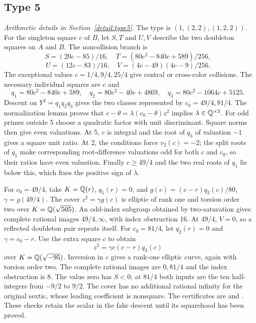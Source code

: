 \subsection{Type 5}\label{app:type5}
\noindent\emph{Arithmetic details in Section~\ref{detail:type5}.}\enspace
The type is $(1,(2,2),(1,2,2))$. For the singleton square $c$ of $B$,
let $S,T$ and $U,V$ describe the two doubleton squares on $A$ and $B$.
The noncollision branch is
\[
 S=(20c-85)/16,\quad T=(80c^2-840c+589)/256,
\]\[
 U=(12c-83)/16,\quad V=(4c-49)(4c-9)/256.
\]
The exceptional values $c=1/4,9/4,25/4$ give central or cross-color
collisions. The necessary individual squares are $c$ and
\[
 q_1=80c^2-840c+589,\quad q_2=80c^2-40c+4869,
 \quad q_3=80c^2-1064c+5125.
\]
Descent on $Y^2=q_1q_2q_3$ gives the two classes represented by
$c_0=49/4,81/4$. The normalization lemma proves that
$c-\theta=\lambda(c_0-\theta)z^2$ implies
$\lambda\in\mathbb Q^{\times2}$. For odd primes outside 5 choose a
quadratic factor with unit discriminant. Square norms then give even
valuations. At 5, $c$ is integral and the root of $q_3$ of valuation
$-1$ gives a square unit ratio. At 2, the conditions force $v_2(c)=-2$;
the split roots of $q_1$ make corresponding root-difference valuations
odd for both $c$ and $c_0$, so their ratios have even valuation.
Finally $c\geq49/4$ and the two real roots of $q_1$ lie below this,
which fixes the positive sign of $\lambda$.

For $c_0=49/4$, take $K=\mathbb Q(r)$, $q_1(r)=0$, and
$g(c)=(c-r)q_3(c)/80$, $\gamma=g(49/4)$.
The cover $z^2=\gamma g(c)$ is elliptic of rank one and torsion order
two over $K=\mathbb Q(\sqrt{505})$. An odd-index subgroup obtained
by two-saturation gives complete rational images $49/4,\infty$,
with index obstruction 16. At $49/4$, $V=0$, so a reflected doubleton
pair repeats itself. For $c_0=81/4$, let $q_2(r)=0$ and
$\gamma=c_0-r$. Use the extra square $c$ to obtain
\[
 z^2=\gamma c(c-r)q_3(c)
\]
over $K=\mathbb Q(\sqrt{-95})$. Inversion in $c$ gives a rank-one
elliptic curve, again with torsion order two. The complete rational
images are $0,81/4$ and the index obstruction is 8. The value zero
has $S<0$; at $81/4$ both inputs are the ten half-integers from
$-9/2$ to $9/2$. The cover has no additional rational infinity
for the original sextic, whose leading coefficient is nonsquare.
The certificates are  and
. These checks retain the scalar in the
fake descent until its squarehood has been proved.

